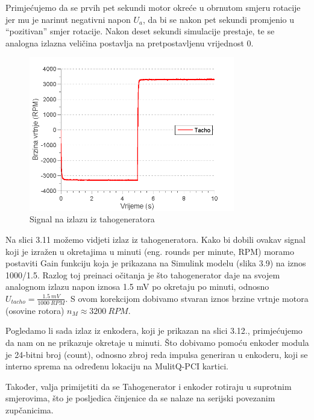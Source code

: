 \documentclass[12pt,a4paper]{article}
\begin{document}
Primjećujemo da se prvih pet sekundi motor okreće u obrnutom smjeru rotacije jer mu je narinut negativni napon $U_a$, da bi se nakon pet sekundi promjenio u “pozitivan” smjer rotacije. Nakon deset sekundi simulacije prestaje, te se analogna izlazna veličina postavlja na pretpostavljenu vrijednost 0.

\begin{figure}[!h]
	\begin{center}
	\includegraphics[width=0.8\textwidth] {tachoRPM.png}
    \caption{Signal na izlazu iz tahogeneratora}
    \end{center}
\end{figure} 

\newpage

Na slici 3.11 možemo vidjeti izlaz iz tahogeneratora. Kako bi dobili ovakav signal koji je izražen u okretajima u minuti (eng. rounds per minute, RPM) moramo postaviti Gain funkciju koja je prikazana na Simulink modelu (slika 3.9) na iznos 1000/1.5. Razlog toj preinaci očitanja je što tahogenerator daje na svojem analognom izlazu napon iznosa 1.5 mV po okretaju po minuti, odnosno $U_{tacho}=\frac{1.5\ mV}{1000\ RPM} $. S ovom korekcijom dobivamo stvaran iznos brzine vrtnje motora (osovine rotora) $n_M \approx 3200\ RPM$.\newline

Pogledamo li sada izlaz iz enkodera, koji je prikazan na slici 3.12., primjećujemo da nam on ne prikazuje okretaje u minuti. Što dobivamo pomoću enkoder modula je 24-bitni broj (count), odnosno zbroj reda impulsa generiran u enkoderu, koji se interno sprema na određenu lokaciju na MulitQ-PCI kartici.

Također, valja primijetiti da se Tahogenerator i enkoder rotiraju u suprotnim smjerovima, što je posljedica činjenice da se nalaze na serijski povezanim zupčanicima.
\end{document}
